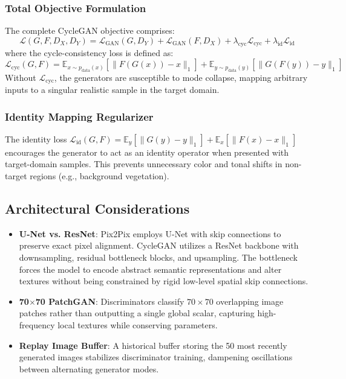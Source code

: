 \documentclass[10pt,journal,compsoc]{IEEEtran}
\begin{document}
\subsubsection{Total Objective Formulation}
The complete CycleGAN objective comprises:
\begin{equation}
\mathcal{L}(G, F, D_X, D_Y) = \mathcal{L}_{\text{GAN}}(G, D_Y) + \mathcal{L}_{\text{GAN}}(F, D_X) + \lambda_{\text{cyc}} \mathcal{L}_{\text{cyc}} + \lambda_{\text{id}} \mathcal{L}_{\text{id}}
\end{equation}
where the cycle-consistency loss is defined as:
\begin{equation}
\mathcal{L}_{\text{cyc}}(G, F) = \mathbb{E}_{x \sim p_{\text{data}}(x)} [\|F(G(x)) - x\|_1] + \mathbb{E}_{y \sim p_{\text{data}}(y)} [\|G(F(y)) - y\|_1]
\end{equation}
Without $\mathcal{L}_{\text{cyc}}$, the generators are susceptible to mode collapse, mapping arbitrary inputs to a singular realistic sample in the target domain.

\subsubsection{Identity Mapping Regularizer}
The identity loss $\mathcal{L}_{\text{id}}(G, F) = \mathbb{E}_y [\|G(y) - y\|_1] + \mathbb{E}_x [\|F(x) - x\|_1]$ encourages the generator to act as an identity operator when presented with target-domain samples. This prevents unnecessary color and tonal shifts in non-target regions (e.g., background vegetation).

\subsection{Architectural Considerations}
\begin{itemize}
    \item \textbf{U-Net vs. ResNet}: Pix2Pix employs U-Net with skip connections to preserve exact pixel alignment. CycleGAN utilizes a ResNet backbone with downsampling, residual bottleneck blocks, and upsampling. The bottleneck forces the model to encode abstract semantic representations and alter textures without being constrained by rigid low-level spatial skip connections.
    \item \textbf{70$\times$70 PatchGAN}: Discriminators classify $70 \times 70$ overlapping image patches rather than outputting a single global scalar, capturing high-frequency local textures while conserving parameters.
    \item \textbf{Replay Image Buffer}: A historical buffer storing the 50 most recently generated images stabilizes discriminator training, dampening oscillations between alternating generator modes.
\end{itemize}
\end{document}
